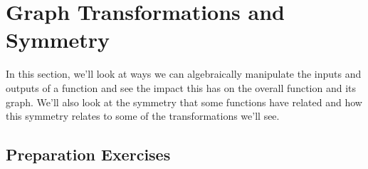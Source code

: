 
\section{Graph Transformations and Symmetry} \label{functions-transformations}

In this section, we'll look at ways we can algebraically manipulate the inputs and outputs of a function and see the impact this has on the overall function and its graph.  We'll also look at the symmetry that some functions have related and how this symmetry relates to some of the transformations we'll see.    \\[0.5em]



\subsection*{Preparation Exercises} \label{prep-functions-transformations}

